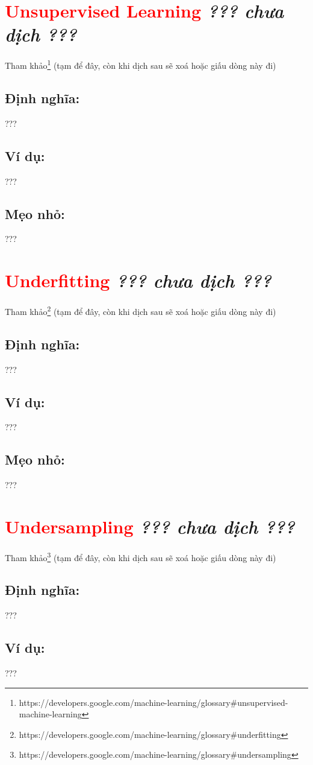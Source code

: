\section*{\huge \textcolor{Red}{Unsupervised Learning}  \small \textit{??? chưa dịch ???} }
Tham khảo\footnote{https://developers.google.com/machine-learning/glossary\#unsupervised-machine-learning} (tạm để đây, còn khi dịch sau sẽ xoá hoặc giấu dòng này đi)
\subsection*{Định nghĩa:}
???
\subsection*{Ví dụ:}
???
\subsection*{Mẹo nhỏ:}
???
\section*{\huge \textcolor{Red}{Underfitting}  \small \textit{??? chưa dịch ???} }
Tham khảo\footnote{https://developers.google.com/machine-learning/glossary\#underfitting} (tạm để đây, còn khi dịch sau sẽ xoá hoặc giấu dòng này đi)
\subsection*{Định nghĩa:}
???
\subsection*{Ví dụ:}
???
\subsection*{Mẹo nhỏ:}
???
\section*{\huge \textcolor{Red}{Undersampling}  \small \textit{??? chưa dịch ???} }
Tham khảo\footnote{https://developers.google.com/machine-learning/glossary\#undersampling} (tạm để đây, còn khi dịch sau sẽ xoá hoặc giấu dòng này đi)
\subsection*{Định nghĩa:}
???
\subsection*{Ví dụ:}
???
